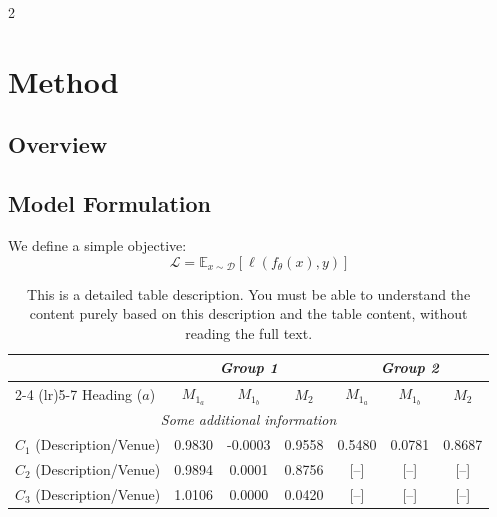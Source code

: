 \documentclass[9pt]{article}
\begin{document}
\begin{multicols}{2}
\lipsum[4]

\section{Method}

\subsection{Overview}

\lipsum[5]

\subsection{Model Formulation}

We define a simple objective:
\begin{equation}
\mathcal{L} = \mathbb{E}_{x \sim \mathcal{D}} \left[ \ell(f_\theta(x), y) \right]
\end{equation}

\lipsum[6]

\begin{table}[t]
  \caption{This is a detailed table description. You must be able to understand the content purely based on this description and the table content, without reading the full text.}
  \label{tab:scaling-laws}
  \vskip 0.15in
  \begin{center}
  \begin{small}
  \begin{tabular}{lcccccc}
    \toprule
    & \multicolumn{3}{c}{\textit{Group 1}} & \multicolumn{3}{c}{\textit{Group 2}} \\
    \cmidrule(lr){2-4} \cmidrule(lr){5-7}
    Heading ($a$) & $M_{1_a}$ & $M_{1_b}$ & $M_{2}$ & $M_{1_a}$ & $M_{1_b}$ & $M_{2}$ \\
    \midrule
    \multicolumn{7}{c}{\textit{Some additional information}} \\
    $C_1$ (Description/Venue) & 0.9830 & -0.0003 & 0.9558 & 0.5480 & 0.0781 & 0.8687 \\
    $C_2$ (Description/Venue) & 0.9894 & 0.0001 & 0.8756 & [--] & [--] & [--] \\
    $C_3$ (Description/Venue) & 1.0106 & 0.0000 & 0.0420 & [--] & [--] & [--] \\
    \bottomrule
  \end{tabular}
  \end{small}
  \end{center}
  \vskip -0.1in
\end{table}


\end{multicols}
\end{document}
